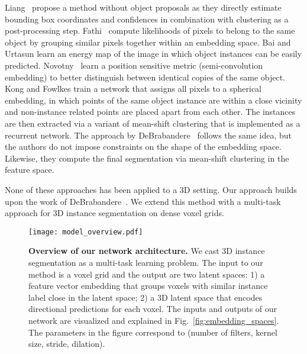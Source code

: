 \documentclass[10pt,twocolumn,letterpaper]{article}
\newcommand{\boldparagraph}[1]{\vspace{0.5em}\noindent{\bf #1} }
\begin{document}
\boldparagraph{2D Instance Segmentation via Metric Learning.}
Liang~\etal\cite{Liang-et-al-TPAMI-2017} propose a method without object proposals as they directly estimate bounding box coordinates and confidences in combination with clustering as a post-processing step. 
Fathi~\etal\cite{Fathi-et-al-arXiv-2017} compute likelihoods of pixels to belong to the same object by grouping similar pixels together within an embedding space. 
Bai and Urtasun \cite{bai2017deep} learn an energy map of the image in which object instances can be easily predicted.
Novotny~\etal\cite{Novotny-et-al-ECCV-2018} learn a position sensitive metric (semi-convolution embedding) to better distinguish between identical copies of the same object.
Kong and Fowlkes \cite{Kong-Fowlkes-CVPR-2018} train a network that assigns all pixels to a spherical embedding, in which points of the same object instance are within a close vicinity and non-instance related points are placed apart from each other.
The instances are then extracted via a variant of mean-shift clustering\cite{Fukunaga-Hostetler-TIT-1975} that is implemented as a recurrent network.
The approach by DeBrabandere~\etal\cite{DeBrabandere-et-al-arXiv-2017} follows the same idea, but the authors do not impose constraints on the shape of the embedding space.
Likewise, they compute the final segmentation via mean-shift clustering in the feature space.



None of these approaches has been applied to a 3D setting.
Our approach builds upon the work of DeBrabandere~\etal\cite{DeBrabandere-et-al-arXiv-2017}.
We extend this method with a multi-task approach for 3D instance segmentation on dense voxel grids.


\begin{figure*}[t]
	\centering
	\texttt{[image: model\_overview.pdf]}
\vspace{-0.7cm}
	\caption{\textbf{Overview of our network architecture.} We cast 3D instance segmentation as a multi-task learning problem. The input to our method is a voxel grid and the output are two latent spaces: 1) a feature vector embedding that groups voxels with similar instance label close in the latent space; 2) a 3D latent space that encodes directional predictions for each voxel. The inputs and outputs of our network are visualized and explained in Fig.~\ref{fig:embedding_spaces}. The parameters in the figure correspond to (number of filters, kernel size, stride, dilation).}
	\label{fig:model_overview}
\end{figure*}
\end{document}
